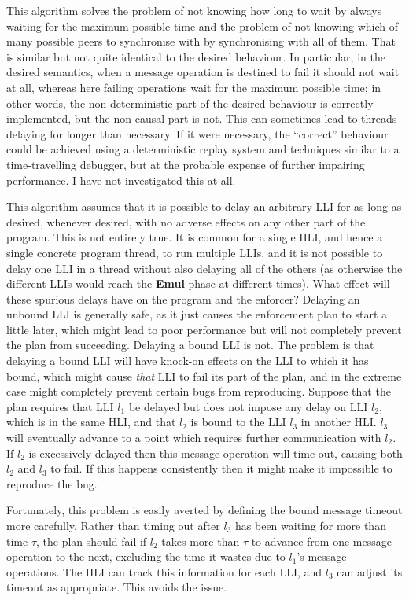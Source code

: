This algorithm solves the problem of not knowing how long to wait by
always waiting for the maximum possible time and the problem of not
knowing which of many possible peers to synchronise with by
synchronising with all of them.  That is similar but not quite
identical to the desired behaviour.  In particular, in the desired
semantics, when a message operation is destined to fail it should not
wait at all, whereas here failing operations wait for the maximum
possible time; in other words, the non-deterministic part of the
desired behaviour is correctly implemented, but the non-causal part is
not.  This can sometimes lead to threads delaying for longer than
necessary.  If it were necessary, the ``correct'' behaviour could be
achieved using a deterministic replay system\cite{Choi1998} and
techniques similar to a time-travelling debugger\cite{Xu2003}, but at
the probable expense of further impairing performance.  I have not
investigated this at all.

This algorithm assumes that it is possible to delay an arbitrary LLI
for as long as desired, whenever desired, with no adverse effects on
any other part of the program.  This is not entirely true.  It is
common for a single HLI, and hence a single concrete program thread,
to run multiple LLIs, and it is not possible to delay one LLI in a
thread without also delaying all of the others (as otherwise the
different LLIs would reach the \textbf{Emul} phase at different
times).  What effect will these spurious delays have on the program
and the enforcer?  Delaying an unbound LLI is generally safe, as it
just causes the enforcement plan to start a little later, which might
lead to poor performance but will not completely prevent the plan from
succeeding.  Delaying a bound LLI is not.  The problem is that
delaying a bound LLI will have knock-on effects on the LLI to which it
has bound, which might cause \emph{that} LLI to fail its part of the
plan, and in the extreme case might completely prevent certain bugs
from reproducing.  Suppose that the plan requires that LLI $l_1$ be
delayed but does not impose any delay on LLI $l_2$, which is in the
same HLI, and that $l_2$ is bound to the LLI $l_3$ in another HLI.
$l_3$ will eventually advance to a point which requires further
communication with $l_2$.  If $l_2$ is excessively delayed then this
message operation will time out, causing both $l_2$ and $l_3$ to fail.
If this happens consistently then it might make it impossible to
reproduce the bug.

Fortunately, this problem is easily averted by defining the bound
message timeout more carefully.  Rather than timing out after $l_3$
has been waiting for more than time $\tau$, the plan should fail if
$l_2$ takes more than $\tau$ to advance from one message operation to
the next, excluding the time it wastes due to $l_1$'s message
operations.  The HLI can track this information for each LLI, and
$l_3$ can adjust its timeout as appropriate.  This avoids the
issue.

